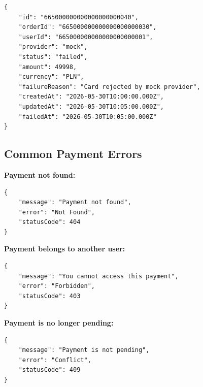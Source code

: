 \begin{verbatim}
{
    "id": "665000000000000000000040",
    "orderId": "665000000000000000000030",
    "userId": "665000000000000000000001",
    "provider": "mock",
    "status": "failed",
    "amount": 49998,
    "currency": "PLN",
    "failureReason": "Card rejected by mock provider",
    "createdAt": "2026-05-30T10:00:00.000Z",
    "updatedAt": "2026-05-30T10:05:00.000Z",
    "failedAt": "2026-05-30T10:05:00.000Z"
}
\end{verbatim}

\subsection{Common Payment Errors}

\textbf{Payment not found:}

\begin{verbatim}
{
    "message": "Payment not found",
    "error": "Not Found",
    "statusCode": 404
}
\end{verbatim}

\textbf{Payment belongs to another user:}

\begin{verbatim}
{
    "message": "You cannot access this payment",
    "error": "Forbidden",
    "statusCode": 403
}
\end{verbatim}

\pagebreak
\textbf{Payment is no longer pending:}

\begin{verbatim}
{
    "message": "Payment is not pending",
    "error": "Conflict",
    "statusCode": 409
}
\end{verbatim}